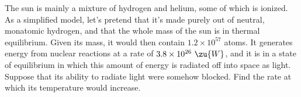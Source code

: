 The sun is mainly a mixture of hydrogen and helium, some of which is
ionized. As a simplified model, let's pretend that it's made purely out
of neutral, monatomic hydrogen, and that the whole mass of the sun is
in thermal equilibrium. Given its mass, it would then contain $1.2\times10^{57}$ atoms.
It generates energy from nuclear reactions at a rate of $3.8\times10^{26}\ \zu{W}$,
and it is in a state of equilibrium in which this amount of energy is radiated off
into space as light. Suppose that its ability to radiate light were somehow blocked.
Find the rate at which its temperature would increase.
\answercheck
